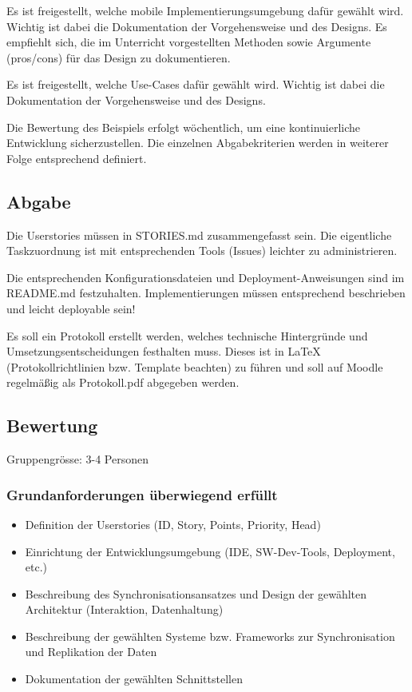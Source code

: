 Es ist freigestellt, welche mobile Implementierungsumgebung dafür gewählt wird. Wichtig ist dabei die Dokumentation der Vorgehensweise und des Designs. Es empfiehlt sich, die im Unterricht vorgestellten Methoden sowie Argumente (pros/cons) für das Design zu dokumentieren.

Es ist freigestellt, welche Use-Cases dafür gewählt wird. Wichtig ist dabei die Dokumentation der Vorgehensweise und des Designs.

Die Bewertung des Beispiels erfolgt wöchentlich, um eine kontinuierliche Entwicklung sicherzustellen. Die einzelnen Abgabekriterien werden in weiterer Folge entsprechend definiert.

\subsection{Abgabe}

Die Userstories müssen in STORIES.md zusammengefasst sein. Die eigentliche Taskzuordnung ist mit entsprechenden Tools (Issues) leichter zu administrieren.

Die entsprechenden Konfigurationsdateien und Deployment-Anweisungen sind im README.md festzuhalten. Implementierungen müssen entsprechend beschrieben und leicht deployable sein!

Es soll ein Protokoll erstellt werden, welches technische Hintergründe und Umsetzungsentscheidungen festhalten muss. Dieses ist in LaTeX (Protokollrichtlinien bzw. Template beachten) zu führen und soll auf Moodle regelmäßig als Protokoll.pdf abgegeben werden.

\subsection{Bewertung}

Gruppengrösse: 3-4 Personen

\subsubsection{Grundanforderungen \textbf{überwiegend erfüllt}}

\begin{itemize}
    \item Definition der Userstories (ID, Story, Points, Priority, Head)
    \item Einrichtung der Entwicklungsumgebung (IDE, SW-Dev-Tools, Deployment, etc.)
    \item Beschreibung des Synchronisationsansatzes und Design der gewählten Architektur (Interaktion, Datenhaltung)
    \item Beschreibung der gewählten Systeme bzw. Frameworks zur Synchronisation und Replikation der Daten
    \item Dokumentation der gewählten Schnittstellen
\end{itemize}

